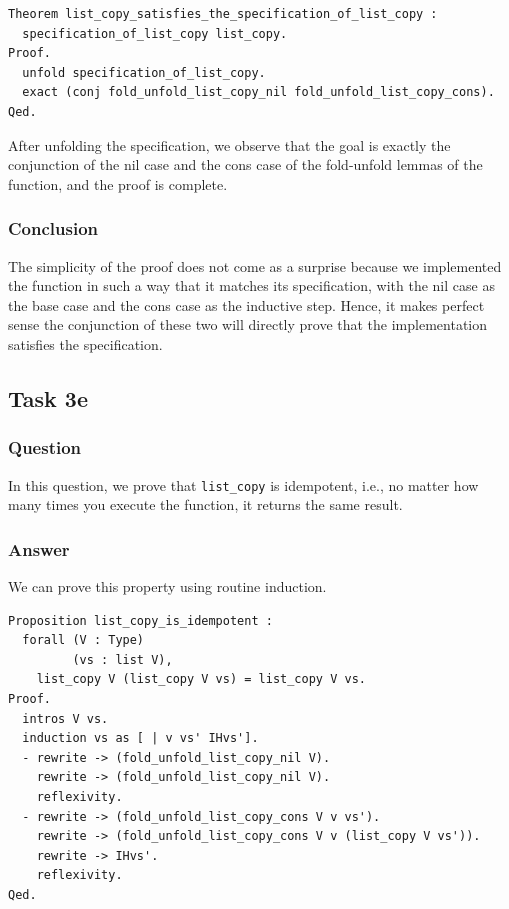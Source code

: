 \documentclass{article}
\begin{document}
\begin{lstlisting}
Theorem list_copy_satisfies_the_specification_of_list_copy :
  specification_of_list_copy list_copy.
Proof.
  unfold specification_of_list_copy.
  exact (conj fold_unfold_list_copy_nil fold_unfold_list_copy_cons).
Qed.
\end{lstlisting}

After unfolding the specification, we observe that the goal is exactly the conjunction of the nil case and the cons case of the fold-unfold lemmas of the function, and the proof is complete.

\subsubsection{Conclusion}
The simplicity of the proof does not come as a surprise because we implemented the function in such a way that it matches its specification, with the nil case as the base case and the cons case as the inductive step. Hence, it makes perfect sense the conjunction of these two will directly prove that the implementation satisfies the specification.

\subsection{Task 3e}
\subsubsection{Question}
In this question, we prove that \texttt{list\_copy} is idempotent, i.e., no matter how many times you execute the function, it returns the same result.

\subsubsection{Answer}
We can prove this property using routine induction.

\begin{lstlisting}
Proposition list_copy_is_idempotent :
  forall (V : Type)
         (vs : list V),
    list_copy V (list_copy V vs) = list_copy V vs.
Proof.
  intros V vs.
  induction vs as [ | v vs' IHvs'].
  - rewrite -> (fold_unfold_list_copy_nil V).
    rewrite -> (fold_unfold_list_copy_nil V).
    reflexivity.
  - rewrite -> (fold_unfold_list_copy_cons V v vs').
    rewrite -> (fold_unfold_list_copy_cons V v (list_copy V vs')).
    rewrite -> IHvs'.
    reflexivity.
Qed.
\end{lstlisting}
\end{document}
